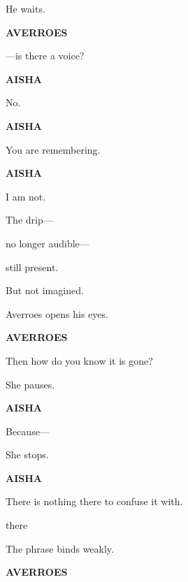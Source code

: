 \medskip

He waits.

\medskip

\textbf{AVERROES}

---is there a voice?

\medskip

\textbf{AISHA}

No.

\medskip

\textbf{AISHA}

You are remembering.

\medskip

\textbf{AISHA}

I am not.

\medskip

\medskip

The drip---

\medskip

no longer audible---

\medskip

still present.

\medskip

But not imagined.

\medskip


\medskip

Averroes opens his eyes.

\medskip

\textbf{AVERROES}

Then how do you know it is gone?

\medskip

She pauses.

\medskip

\textbf{AISHA}

Because---

\medskip

She stops.

\medskip

\textbf{AISHA}

There is nothing there to confuse it with.

\medskip

 there

\medskip

The phrase binds weakly.

\medskip

\textbf{AVERROES}

